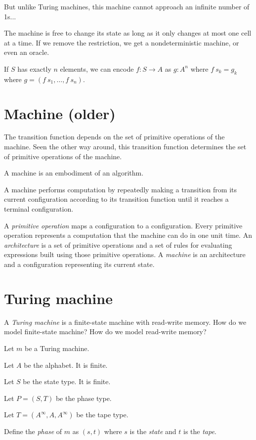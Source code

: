 But unlike Turing machines, this machine cannot approach an infinite number of 1s...

The machine is free to change its state as long as it only changes at most one cell at a time.
If we remove the restriction, we get a nondeterministic machine,
or even an oracle.

If \(S\) has exactly \(n\) elements,
we can encode \(f : S \to A\) as \(g : A^n\)
where \(f~s_k = g_k\) where \(g = (f~s_1, \ldots, f~s_n)\).

\section{Machine (older)}

The transition function depends on the set of primitive operations of the machine.
Seen the other way around, this transition function
determines the set of primitive operations of the machine.

A machine is an embodiment of an algorithm.

A machine performs computation by repeatedly
making a transition from its current configuration
according to its transition function
until it reaches a terminal configuration.

A \emph{primitive operation} maps a configuration to a configuration.
Every primitive operation represents a computation that the machine can do in one unit time.
An \emph{architecture} is a set of primitive operations
and a set of rules for evaluating expressions built using those primitive operations.
A \emph{machine} is an architecture and a configuration representing its current state.

\section{Turing machine}

A \emph{Turing machine} is a finite-state machine with read-write memory.
How do we model finite-state machine?
How do we model read-write memory?

Let \(m\) be a Turing machine.

Let \(A\) be the alphabet.
It is finite.

Let \(S\) be the state type.
It is finite.

Let \(P = (S,T)\) be the phase type.

Let \(T = (A^\infty,A,A^\infty)\) be the tape type.

Define the \emph{phase} of \(m\) as \((s,t)\)
where \(s\) is the \emph{state} and \(t\) is the \emph{tape}.

